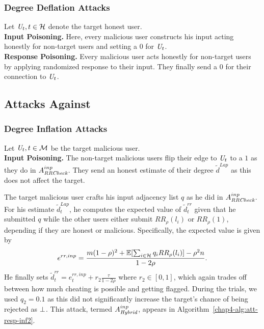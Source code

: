 \subsubsection{Degree Deflation Attacks}
Let $\textit{U}_t, t \in \mathcal{H}$ denote the target honest user. \\\noindent\textbf{Input Poisoning.} Here, every malicious user constructs his input acting honestly for non-target users and setting a $0$ for $\textit{U}_t$.
\\\noindent\textbf{Response Poisoning.} 
Every malicious user acts honestly for non-target users by applying randomized response to their input. They finally send a $0$ for their connection to $\textit{U}_t$.
\subsection{Attacks Against \DegHybrid{}}

\subsubsection{Degree Inflation Attacks}
Let $\textit{U}_t, t \in \mathcal{M}$ be the target malicious user.
\\
\noindent\textbf{Input Poisoning.} The non-target malicious users flip their edge to $\textit{U}_t$ to a $1$ as they do in $A_{\textit{RRCheck}{}}^{inp}$. They send an honest estimate of their degree $\tilde{d}^{Lap}$ as this does not affect the target.

The target malicious user crafts his input adjacency list $q$ as he did in $A_{\textit{RRCheck}}^{inp}$. For his estimate $\tilde{d}_t^{Lap}$, he 
computes the expected value of $\tilde{d}_t^{rr}$ given that he submitted $q$ while the other users either submit $RR_\rho(l_i)$ or $RR_\rho(1)$, depending if they are honest or malicious. Specifically, the expected value is given by
\[
    e^{rr,inp} = \frac{m(1-\rho)^2 + \operatorname{\mathbb{E}}[\sum_{i \in \mathcal{H}} q_i RR_\rho(l_i)] - \rho^2 n}{1-2\rho}.
\]
He finally sets $\tilde{d}_t^{rr} = e_t^{rr,inp} + r_2 \frac{\tau}{1-2\rho}$ where $r_2 \in [0,1]$, which again trades off between how much cheating is possible and getting flagged. During the trials, we used $q_2 = 0.1$ as this did not significantly increase the target's chance of being rejected as $\perp$. This attack, termed $A_{\textit{Hybrid}}^{inp}$, appears in Algorithm~\ref{chap4-alg:att-resp-inf2}.

